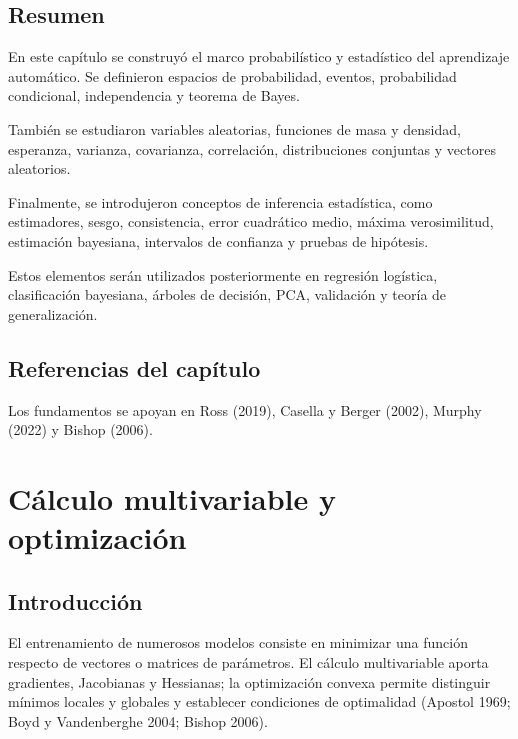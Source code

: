 \documentclass[
  spanish,
  10.5pt,
  letterpaper,
  DIV=11,
  numbers=noendperiod,
  oneside,
  open=any]{scrreprt}
\theoremstyle{definition}
\theoremstyle{definition}
\theoremstyle{plain}
\theoremstyle{remark}
\begin{document}
\section*{Resumen}\label{resumen-2}


En este capítulo se construyó el marco probabilístico y estadístico del
aprendizaje automático. Se definieron espacios de probabilidad, eventos,
probabilidad condicional, independencia y teorema de Bayes.

También se estudiaron variables aleatorias, funciones de masa y
densidad, esperanza, varianza, covarianza, correlación, distribuciones
conjuntas y vectores aleatorios.

Finalmente, se introdujeron conceptos de inferencia estadística, como
estimadores, sesgo, consistencia, error cuadrático medio, máxima
verosimilitud, estimación bayesiana, intervalos de confianza y pruebas
de hipótesis.

Estos elementos serán utilizados posteriormente en regresión logística,
clasificación bayesiana, árboles de decisión, PCA, validación y teoría
de generalización.

\section*{Referencias del capítulo}\label{referencias-del-capuxedtulo-2}


Los fundamentos se apoyan en Ross (2019), Casella y Berger (2002),
Murphy (2022) y Bishop (2006).

\chapter{Cálculo multivariable y
optimización}\label{sec-calculo-optimizacion}

\section*{Introducción}\label{introducciuxf3n-4}


El entrenamiento de numerosos modelos consiste en minimizar una función
respecto de vectores o matrices de parámetros. El cálculo multivariable
aporta gradientes, Jacobianas y
Hessianas; la optimización convexa
permite distinguir mínimos locales y globales y establecer condiciones
de optimalidad (Apostol 1969; Boyd y Vandenberghe 2004; Bishop 2006).
\end{document}
